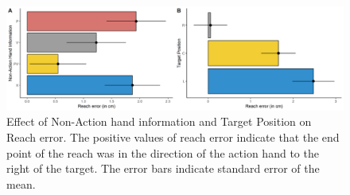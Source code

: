 \begin{figure}
\centering       
    \includegraphics[width=\textwidth, keepaspectratio]{Images/exp1-mre.png}
    \caption{Effect of Non-Action hand information and Target Position on Reach error. The positive values of reach error indicate that the end point of the reach was in the direction of the action hand to the right of the target. The error bars indicate standard error of the mean.}
    \label{fig:exp1-mre}
\end{figure}